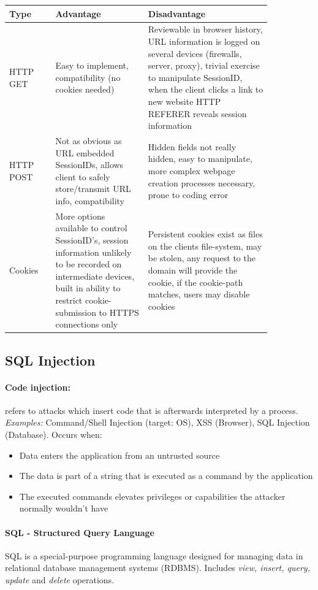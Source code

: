 \begin{tabular}{p{0.15\linewidth}p{0.3\linewidth}p{0.4\linewidth}}
Type & Advantage & Disadvantage \\
\hline
\hline
HTTP GET & Easy to implement, compatibility (no cookies needed)  &  Reviewable in browser history, URL information is logged on several devices (firewalls, server, proxy), trivial exercise to manipulate SessionID, when the client clicks a link to new website HTTP REFERER reveals session information \\
\hline
HTTP POST & Not as obvious as URL embedded SessionIDs, allows client to safely store/transmit URL info, compatibility & Hidden fields not really hidden, easy to manipulate, more complex webpage creation processes necessary, prone to coding error \\
\hline
Cookies & More options available to control SessionID's, session information unlikely to be recorded on intermediate devices, built in ability to restrict cookie-submission to HTTPS connections only & Persistent cookies exist as files on the clients file-system, may be stolen, any request to the domain will provide the cookie, if the cookie-path matches, users may disable cookies \\
\end{tabular}

\subsection{SQL Injection}

\paragraph{Code injection:} refers to attacks which insert code that is afterwards interpreted by a process. \emph{Examples:} Command/Shell Injection (target: OS), XSS (Browser), SQL Injection (Database). Occurs when:
\begin{itemize}
\item Data enters the application from an untrusted source
\item The data is part of a string that is executed as a command by the application
\item The executed commands elevates privileges or capabilities the attacker normally wouldn't have
\end{itemize}

\paragraph{SQL - Structured Query Language} SQL is a special-purpose programming language designed for managing data in relational database management systems (RDBMS). Includes \emph{view, insert, query, update} and \emph{delete} operations.

